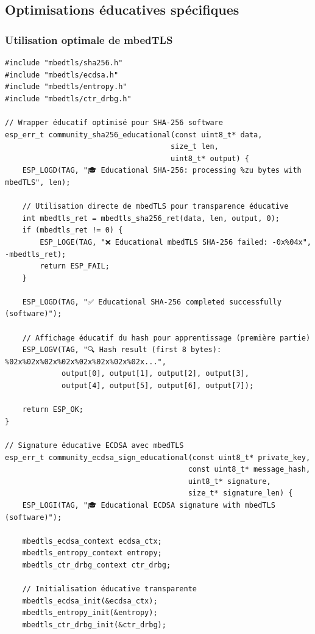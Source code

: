 \subsection{Optimisations éducatives spécifiques}

\subsubsection{Utilisation optimale de mbedTLS}

\begin{lstlisting}[caption={Optimisations éducatives avec mbedTLS}]
#include "mbedtls/sha256.h"
#include "mbedtls/ecdsa.h"
#include "mbedtls/entropy.h"
#include "mbedtls/ctr_drbg.h"

// Wrapper éducatif optimisé pour SHA-256 software
esp_err_t community_sha256_educational(const uint8_t* data, 
                                      size_t len, 
                                      uint8_t* output) {
    ESP_LOGD(TAG, "🎓 Educational SHA-256: processing %zu bytes with mbedTLS", len);
    
    // Utilisation directe de mbedTLS pour transparence éducative
    int mbedtls_ret = mbedtls_sha256_ret(data, len, output, 0);
    if (mbedtls_ret != 0) {
        ESP_LOGE(TAG, "❌ Educational mbedTLS SHA-256 failed: -0x%04x", -mbedtls_ret);
        return ESP_FAIL;
    }
    
    ESP_LOGD(TAG, "✅ Educational SHA-256 completed successfully (software)");
    
    // Affichage éducatif du hash pour apprentissage (première partie)
    ESP_LOGV(TAG, "🔍 Hash result (first 8 bytes): %02x%02x%02x%02x%02x%02x%02x%02x...", 
             output[0], output[1], output[2], output[3],
             output[4], output[5], output[6], output[7]);
    
    return ESP_OK;
}

// Signature éducative ECDSA avec mbedTLS
esp_err_t community_ecdsa_sign_educational(const uint8_t* private_key,
                                          const uint8_t* message_hash,
                                          uint8_t* signature,
                                          size_t* signature_len) {
    ESP_LOGI(TAG, "🎓 Educational ECDSA signature with mbedTLS (software)");
    
    mbedtls_ecdsa_context ecdsa_ctx;
    mbedtls_entropy_context entropy;
    mbedtls_ctr_drbg_context ctr_drbg;
    
    // Initialisation éducative transparente
    mbedtls_ecdsa_init(&ecdsa_ctx);
    mbedtls_entropy_init(&entropy);
    mbedtls_ctr_drbg_init(&ctr_drbg);
    

\end{lstlisting}
